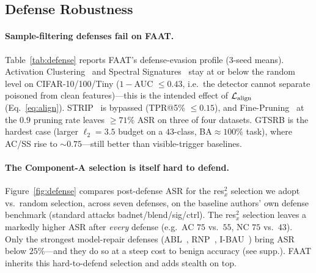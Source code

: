 \subsection{Defense Robustness}
\label{sec:defense}




\paragraph{Sample-filtering defenses fail on FAAT.}
Table~\ref{tab:defense} reports FAAT's defense-evasion profile (3-seed means).
Activation Clustering~\cite{chen2018activation} and Spectral
Signatures~\cite{tran2018spectral} stay at or below the random level on
CIFAR-10/100/Tiny ($1{-}$AUC $\le 0.43$, i.e.\ the detector cannot separate
poisoned from clean features)---this is the intended effect of $\mathcal{L}_{\mathrm{align}}$
(Eq.~\ref{eq:align}). STRIP~\cite{gao2019strip} is bypassed (TPR@5\%
$\le 0.15$), and Fine-Pruning~\cite{liu2018finepruning} at the $0.9$ pruning
rate leaves $\ge\!71\%$ ASR on three of four datasets. GTSRB is the hardest case
(larger $\ell_2\!=\!3.5$ budget on a $43$-class, BA$\approx\!100\%$ task), where
AC/SS rise to $\sim\!0.75$---still better than visible-trigger baselines.

\paragraph{The Component-A selection is itself hard to defend.}
Figure~\ref{fig:defense} compares post-defense ASR for the res$_x^2$ selection
we adopt vs.\ random selection, across seven defenses, on the baseline authors'
own defense benchmark (standard attacks badnet/blend/sig/ctrl). The res$_x^2$
selection leaves a markedly higher ASR after \emph{every} defense (e.g.\ AC
$75$ vs.\ $55$, NC $75$ vs.\ $43$). Only the strongest model-repair defenses
(ABL~\cite{li2021abl}, RNP~\cite{li2023rnp}, I-BAU~\cite{zeng2022ibau}) bring
ASR below $25\%$---and they do so at a steep cost to benign accuracy
(see supp.). FAAT inherits this hard-to-defend selection and
adds stealth on top.

